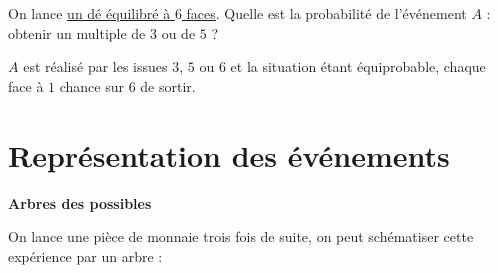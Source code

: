 \documentclass[a4paper,10pt]{report}
\begin{document}
\begin{ex}
On lance \href{https://fr.piliapp.com/random/dice/}{un dé équilibré à $6$ faces}. Quelle est la probabilité de l'événement $A$ : \og obtenir un multiple de $3$ ou de $5$ \fg{} ?

\medskip
\noindent $A$ est réalisé par les issues $3$, $5$ ou $6$ et la situation étant équiprobable, chaque face à $1$ chance sur $6$ de sortir.

\medskip \noindent\grandscarreaux{\linewidth}{2.4cm}
\end{ex}

\section{Représentation des événements} 

\noindent \begin{minipage}{8cm}
\noindent \textbf{Arbres des possibles}

On lance une pièce de monnaie trois fois de suite, on peut schématiser cette expérience par un arbre :


\end{minipage}
\end{document}
